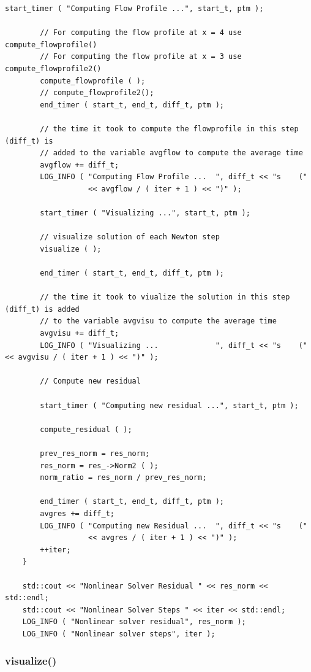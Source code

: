\documentclass{article}
\begin{document}
\begin{lstlisting}[firstnumber=484]
        start_timer ( "Computing Flow Profile ...", start_t, ptm );

        // For computing the flow profile at x = 4 use compute_flowprofile()
        // For computing the flow profile at x = 3 use compute_flowprofile2()
        compute_flowprofile ( );
        // compute_flowprofile2();
        end_timer ( start_t, end_t, diff_t, ptm );

        // the time it took to compute the flowprofile in this step (diff_t) is
        // added to the variable avgflow to compute the average time
        avgflow += diff_t;
        LOG_INFO ( "Computing Flow Profile ...  ", diff_t << "s    ("
                   << avgflow / ( iter + 1 ) << ")" );

        start_timer ( "Visualizing ...", start_t, ptm );

        // visualize solution of each Newton step
        visualize ( );

        end_timer ( start_t, end_t, diff_t, ptm );

        // the time it took to viualize the solution in this step (diff_t) is added
        // to the variable avgvisu to compute the average time
        avgvisu += diff_t;
        LOG_INFO ( "Visualizing ...             ", diff_t << "s    (" << avgvisu / ( iter + 1 ) << ")" );

        // Compute new residual

        start_timer ( "Computing new residual ...", start_t, ptm );

        compute_residual ( );

        prev_res_norm = res_norm;
        res_norm = res_->Norm2 ( );
        norm_ratio = res_norm / prev_res_norm;

        end_timer ( start_t, end_t, diff_t, ptm );
        avgres += diff_t;
        LOG_INFO ( "Computing new Residual ...  ", diff_t << "s    ("
                   << avgres / ( iter + 1 ) << ")" );
        ++iter;
    }

    std::cout << "Nonlinear Solver Residual " << res_norm << std::endl;
    std::cout << "Nonlinear Solver Steps " << iter << std::endl;
    LOG_INFO ( "Nonlinear solver residual", res_norm );
    LOG_INFO ( "Nonlinear solver steps", iter );
\end{lstlisting}

\subsubsection{visualize()}
\label{sec:visualize}
\end{document}
